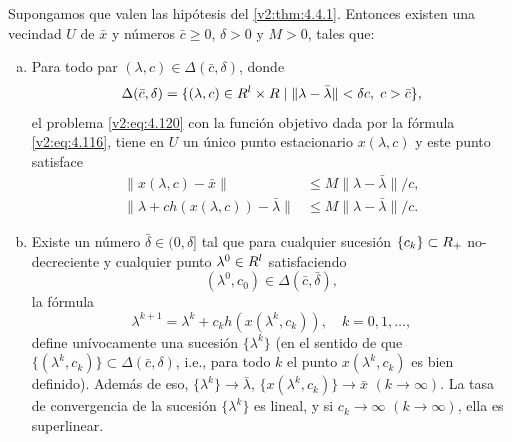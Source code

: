 \begin{theorem}\label{v2:thm:4.4.6}
    Supongamos que valen las hipótesis del \cref{v2:thm:4.4.1}.
    Entonces existen una vecindad $U$ de $\bar{x}$ y números $\bar{c} \ge 0$, $\delta > 0$ y $M > 0$, tales que:
    \begin{enumerate}[(a)]
        \item Para todo par $(\lambda, c) \in \Delta(\bar{c}, \delta)$, donde
        \[
            \Delta(\bar{c}, \delta) = \{(\lambda, c) \in R^l \times R \mid \|\lambda - \bar{\lambda}\| < \delta c, \; c > \bar{c}\},
        \]
        el problema \eqref{v2:eq:4.120} con la función objetivo dada por la fórmula \eqref{v2:eq:4.116}, tiene en $U$ un único punto estacionario $x(\lambda, c)$ y este punto satisface
        \begin{align}
            \|x(\lambda, c) - \bar{x}\| &\le M\|\lambda - \bar{\lambda}\|/c, \label{v2:eq:4.121} \\
            \|\lambda + c h(x(\lambda, c)) - \bar{\lambda}\| &\le M\|\lambda - \bar{\lambda}\|/c. \nonumber
        \end{align}
        \item Existe un número $\bar{\delta} \in (0, \delta]$ tal que para cualquier sucesión $\{c_k\} \subset R_+$ no-decreciente y cualquier punto $\lambda^0 \in R^l$ satisfaciendo
        \begin{equation}
            (\lambda^0, c_0) \in \Delta(\bar{c}, \bar{\delta}),
            \label{v2:eq:4.122}
        \end{equation}
        la fórmula
        \[
            \lambda^{k+1} = \lambda^k + c_k h(x(\lambda^k, c_k)), \quad k = 0, 1, \dots,
        \]
        define unívocamente una sucesión $\{\lambda^k\}$ (en el sentido de que $\{(\lambda^k, c_k)\} \subset \Delta(\bar{c}, \delta)$, i.e., para todo $k$ el punto $x(\lambda^k, c_k)$ es bien definido).
        Además de eso, $\{\lambda^k\} \to \bar{\lambda}$, $\{x(\lambda^k, c_k)\} \to \bar{x}$ $(k \to \infty)$. La tasa de convergencia de la sucesión $\{\lambda^k\}$ es lineal, y si $c_k \to \infty$ $(k \to \infty)$, ella es superlinear.
    \end{enumerate}
\end{theorem}

